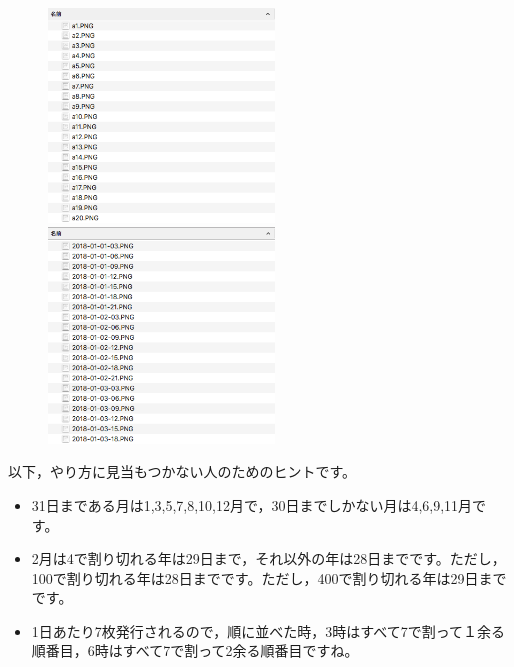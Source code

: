 \documentclass[a4j]{ltjsreport}
\begin{document}
    \begin{figure}[h]
        \begin{minipage}{0.5\hsize}
            \begin{center}
                \includegraphics[width=60mm]{before.PNG}
            \end{center}
        \end{minipage}
        \begin{minipage}{0.5\hsize}
            \begin{center}
                \includegraphics[width=60mm]{after.PNG}
            \end{center}
        \end{minipage}
    \end{figure}


    以下，やり方に見当もつかない人のためのヒントです。

    \begin{itemize}
        \item 31日まである月は1,3,5,7,8,10,12月で，30日までしかない月は4,6,9,11月です。
        \item 2月は4で割り切れる年は29日まで，それ以外の年は28日までです。ただし，100で割り切れる年は28日までです。ただし，400で割り切れる年は29日までです。
        \item 1日あたり7枚発行されるので，順に並べた時，3時はすべて7で割って１余る順番目，6時はすべて7で割って2余る順番目ですね。
    \end{itemize}
\end{document}
